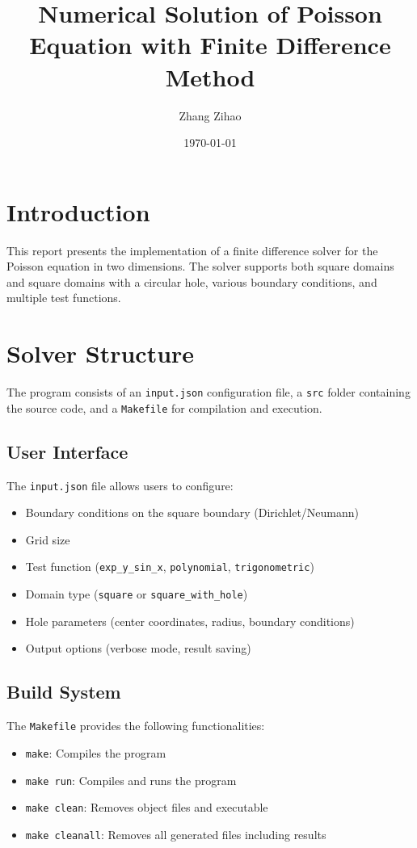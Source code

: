 \documentclass[12pt,a4paper]{article}
\title{Numerical Solution of Poisson Equation with Finite Difference Method}
\author{Zhang Zihao}
\date{\today}
\begin{document}
\maketitle

\section{Introduction}
This report presents the implementation of a finite difference solver for the Poisson equation in two dimensions. The solver supports both square domains and square domains with a circular hole, various boundary conditions, and multiple test functions.

\section{Solver Structure}

The program consists of an \texttt{input.json} configuration file, a \texttt{src} folder containing the source code, and a \texttt{Makefile} for compilation and execution.

\subsection{User Interface}
The \texttt{input.json} file allows users to configure:
\begin{itemize}
    \item Boundary conditions on the square boundary (Dirichlet/Neumann)
    \item Grid size
    \item Test function (\texttt{exp\_y\_sin\_x}, \texttt{polynomial}, \texttt{trigonometric})
    \item Domain type (\texttt{square} or \texttt{square\_with\_hole})
    \item Hole parameters (center coordinates, radius, boundary conditions)
    \item Output options (verbose mode, result saving)
\end{itemize}

\subsection{Build System}
The \texttt{Makefile} provides the following functionalities:
\begin{itemize}
    \item \texttt{make}: Compiles the program
    \item \texttt{make run}: Compiles and runs the program
    \item \texttt{make clean}: Removes object files and executable
    \item \texttt{make cleanall}: Removes all generated files including results
\end{itemize}
\end{document}
